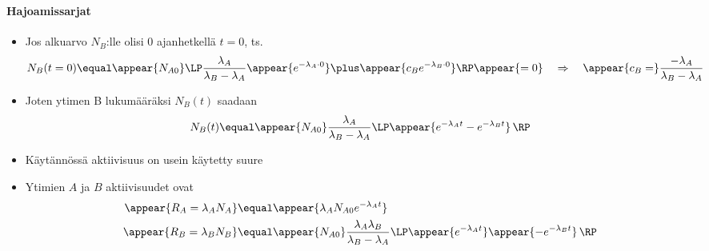 \begin{frame}
\frametitle{\texorpdfstring{\culine[\sectiontitleulinecolor]{\sectiontitle}}{\sectiontitle} }
\framesubtitle{Hajoamissarjat}%
\appear{}

\begin{itemize}
	\item Jos alkuarvo $N_{B}$:lle olisi 0 ajanhetkellä $t=0$, ts.
\[
N_{B}(t=0)  \equal \appear{N_{A 0}} \LP \frac{\lambda_{A}}{\lambda_{B}-\lambda_{A}} \appear{e^{-\lambda_{A} \cdot 0}}  \plus \appear{c_{B} e^{-\lambda_{B} \cdot 0}} \RP \appear{=0} \quad \Rightarrow \quad \appear{c_{B}=}\frac{-\lambda_{A}}{\lambda_{B}-\lambda_{A}}
\]

\item Joten ytimen B lukumääräksi $N_{B}(t)$ saadaan
\[
N_{B}(t)  \equal \appear{N_{A 0}} \frac{\lambda_{A}}{\lambda_{B}-\lambda_{A}}
\LP \appear{e^{-\lambda_{A} t}-e^{-\lambda_{B} t}} \,\RP
\]

\item Käytännössä aktiivisuus on usein käytetty suure

\item Ytimien $A$ ja $B$ aktiivisuudet ovat
$$
\begin{aligned}
\appear{R_A = \lambda_{A} N_{A}} & \equal \appear{\lambda_{A} N_{A 0} e^{-\lambda_{A} t}} \\
\appear{R_B = \lambda_{B} N_{B}} & \equal \appear{N_{A 0}} \frac{\lambda_{A} \lambda_{B}}{\lambda_{B}-\lambda_{A}} \LP \appear{e^{-\lambda_{A} t}}\appear{-e^{-\lambda_{B} t}} \,\RP 
\end{aligned}
$$
\end{itemize}

\endofslide 
\end{frame}

